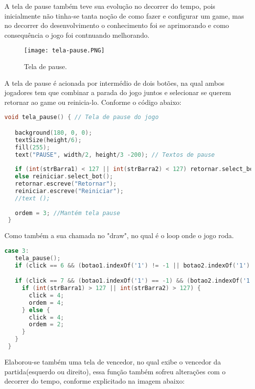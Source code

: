 A tela de pause também teve sua evolução no decorrer do tempo, pois inicialmente não tinha-se tanta noção de como
fazer e configurar um game, mas no decorrer do desenvolvimento o conhecimento foi se aprimorando e como consequência
o jogo foi contnuando melhorando.

\begin{figure}[htbp]
   \centerline{
      \texttt{[image: tela-pause.PNG]}
      }
   \caption{Tela de pause.}
   \label{fig}
  \end{figure}

  A tela de pause é acionada por intermédio de dois botões, na qual ambos jogadores tem que combinar a parada
  do jogo juntos e selecionar se querem retornar ao game ou reinicia-lo. Conforme o código abaixo:  

  \begin{lstlisting}[language=C]
   void tela_pause() { // Tela de pause do jogo

   background(180, 0, 0);
   textSize(height/6);
   fill(255);
   text("PAUSE", width/2, height/3 -200); // Textos de pause
 
   if (int(strBarra1) < 127 || int(strBarra2) < 127) retornar.select_bot();
   else reiniciar.select_bot();
   retornar.escreve("Retornar");
   reiniciar.escreve("Reiniciar");
   //text ();
 
   ordem = 3; //Mantém tela pause
 }
  \end{lstlisting}

  Como também a sua chamada no "draw", no qual é o loop onde o jogo roda.
  \begin{lstlisting}[language=C]
   case 3:
   tela_pause();
   if (click == 6 && (botao1.indexOf('1') != -1 || botao2.indexOf('1') != -1)) click = 7;

   if (click == 7 && (botao1.indexOf('1') == -1) && (botao2.indexOf('1') == -1)) {
     if (int(strBarra1) > 127 || int(strBarra2) > 127) {
       click = 4;
       ordem = 4;
     } else {
       click = 4;
       ordem = 2;
     }
   }
 }
  \end{lstlisting}

  Elaborou-se também uma tela  de vencedor, no qual exibe o vencedor da partida(esquerdo ou direito), essa função também sofreu alterações
  com o decorrer do tempo, conforme explicitado na imagem abaixo:
  
